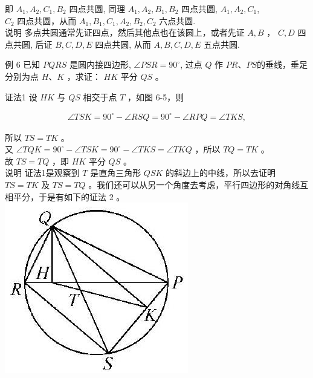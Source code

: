 \documentclass[10pt]{article}
\begin{document}
即 $A_{1}, A_{2}, C_{1}, B_{2}$ 四点共圆, 同理 $A_{1}, A_{2}, B_{1}, B_{2}$ 四点共圆, $A_{1}, A_{2}, C_{1}$,\\
$C_{2}$ 四点共圆，从而 $A_{1}, B_{1}, C_{1}, A_{2}, B_{2}, C_{2}$ 六点共圆.\\
说明 多点共圆通常先证四点，然后其他点也在该圆上，或者先证 $A, B$ ， $C, D$ 四点共圆, 后证 $B, C, D, E$ 四点共圆, 从而 $A, B, C, D, E$ 五点共圆.

例 6 已知 $P Q R S$ 是圆内接四边形, $\angle P S R=90^{\circ}$, 过点 $Q$ 作 $P R 、 P S$的垂线，垂足分别为点 $H 、 K$ ，求证： $H K$ 平分 $Q S$ 。

证法1 设 $H K$ 与 $Q S$ 相交于点 $T$ ，如图 6-5，则

\begin{align*}
\angle T S K=90^{\circ}-\angle R S Q=90^{\circ}-\angle R P Q=\angle T K S,
\end{align*}

所以 $T S=T K$ 。\\
又 $\angle T Q K=90^{\circ}-\angle T S K=90^{\circ}-\angle T K S=\angle T K Q$ ，所以 $T Q=T K$ 。\\
故 $T S=T Q$ ，即 $H K$ 平分 $Q S$ 。\\
说明 证法1是观察到 $T$ 是直角三角形 $Q S K$ 的斜边上的中线，所以去证明 $T S=T K$ 及 $T S=T Q$ 。我们还可以从另一个角度去考虑，平行四边形的对角线互相平分，于是有如下的证法 2 。\\
\includegraphics[max width=\textwidth, center]{2024_10_30_66b8e5e701da2093c133g-046(1)}
\end{document}
